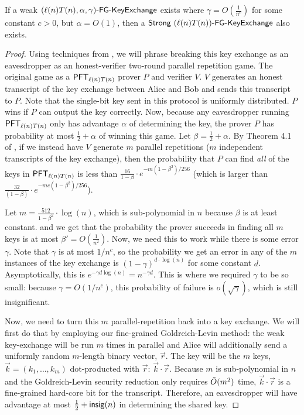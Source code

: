 \begin{theorem}\label{thm:amplifyKeyXC}
	If a weak $\fgkeyxc{\ell(n)T(n)}{\alpha}{\gamma}$ exists where $\gamma = O\left(\frac{1}{n^c}\right)$ for some constant $c>0$, but $\alpha = O(1)$, then a $\strongfgkeyxc{\ell(n)T(n)}$ also exists.
\end{theorem}
\begin{proof}
	Using techniques from \cite{BIN97}, we will phrase breaking this key exchange as an eavesdropper as an honest-verifier two-round parallel repetition game. The original game as a $\PFT{\ell(n)T(n)}$ prover $P$ and verifier $V$. $V$ generates an honest transcript of the key exchange between Alice and Bob and sends this transcript to $P$. Note that the single-bit key sent in this protocol is uniformly distributed. $P$ wins if $P$ can output the key correctly. Now, because any eavesdropper running $\PFT{\ell(n)T(n)}$ only has advantage $\alpha$ of determining the key, the prover $P$ has probability at most $\frac 1 2 + \alpha$ of winning this game. Let $\beta = \frac 1 2 + \alpha$. By Theorem 4.1 of \cite{BIN97}, if we instead have $V$ generate $m$ parallel repetitions ($m$ independent transcripts of the key exchange), then the probability that $P$ can find \emph{all} of the keys in $\PFT{\ell(n)T(n)}$ is less than $\frac{16}{1 - \beta} \cdot e^{-m (1 - \beta^2)/256}$ (which is larger than $\frac{32}{(1 - \beta)} \cdot e^{-mc(1 - \beta^2) / 256}$).
	
	Let $m = \frac{512}{1 - \beta^2} \cdot \log(n)$, which is sub-polynomial in $n$ because $\beta$ is at least constant. and we get that the probability the prover succeeds in finding all $m$ keys is at most $\beta' = O\left( \frac{1}{n^2} \right)$. Now, we need this to work while there is some error $\gamma$. Note that $\gamma$ is at most $1/n^c$, so the probability we get an error in any of the $m$ instances of the key exchange is $\left( 1 - \gamma \right)^{d\cdot \log(n)}$ for some constant $d$. Asymptotically, this is $e^{-\gamma d \log(n)} = n^{-\gamma d}$. This is where we required $\gamma$ to be so small: because $\gamma = O(1/n^c)$, this probability of failure is $o(\sqrt{\gamma})$, which is still insignificant.
	
	Now, we need to turn this $m$ parallel-repetition back into a key exchange. We will first do that by employing our fine-grained Goldreich-Levin method: the weak key-exchange will be run $m$ times in parallel and Alice will additionally send a uniformly random $m$-length binary vector, $\vec r$. The key will be the $m$ keys, $\vec k = (k_1, \ldots, k_m)$ dot-producted with $\vec r$: $\vec k \cdot \vec r$. Because $m$ is sub-polynomial in $n$ and the Goldreich-Levin security reduction only requires $\~O(m^2)$ time, $\vec k \cdot \vec r$ is a fine-grained hard-core bit for the transcript. Therefore, an eavesdropper will have advantage at most $\frac 1 2 + \insig(n)$ in determining the shared key.
\end{proof}

